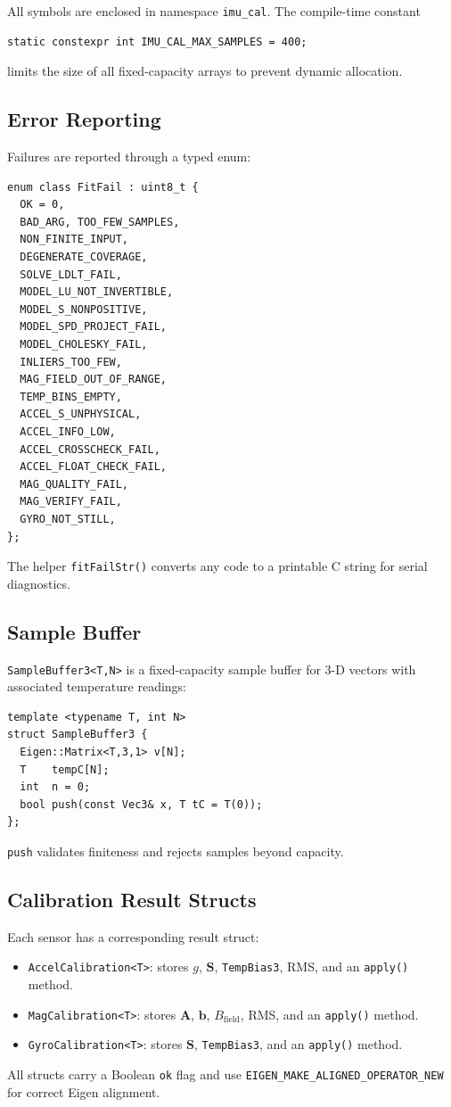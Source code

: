 \documentclass[conference]{IEEEtran}
\begin{document}
    All symbols are enclosed in namespace \texttt{imu\_cal}.
    The compile-time constant
    \begin{lstlisting}
static constexpr int IMU_CAL_MAX_SAMPLES = 400;
    \end{lstlisting}
    limits the size of all fixed-capacity arrays to prevent dynamic
    allocation.

    \subsection{Error Reporting}

    Failures are reported through a typed enum:
    \begin{lstlisting}
enum class FitFail : uint8_t {
  OK = 0,
  BAD_ARG, TOO_FEW_SAMPLES,
  NON_FINITE_INPUT,
  DEGENERATE_COVERAGE,
  SOLVE_LDLT_FAIL,
  MODEL_LU_NOT_INVERTIBLE,
  MODEL_S_NONPOSITIVE,
  MODEL_SPD_PROJECT_FAIL,
  MODEL_CHOLESKY_FAIL,
  INLIERS_TOO_FEW,
  MAG_FIELD_OUT_OF_RANGE,
  TEMP_BINS_EMPTY,
  ACCEL_S_UNPHYSICAL,
  ACCEL_INFO_LOW,
  ACCEL_CROSSCHECK_FAIL,
  ACCEL_FLOAT_CHECK_FAIL,
  MAG_QUALITY_FAIL,
  MAG_VERIFY_FAIL,
  GYRO_NOT_STILL,
};
    \end{lstlisting}
    The helper \texttt{fitFailStr()} converts any code to a printable
    C string for serial diagnostics.

    \subsection{Sample Buffer}

    \texttt{SampleBuffer3<T,N>} is a fixed-capacity sample buffer for
    3-D vectors with associated temperature readings:
    \begin{lstlisting}
template <typename T, int N>
struct SampleBuffer3 {
  Eigen::Matrix<T,3,1> v[N];
  T    tempC[N];
  int  n = 0;
  bool push(const Vec3& x, T tC = T(0));
};
    \end{lstlisting}
    \texttt{push} validates finiteness and rejects samples beyond capacity.

    \subsection{Calibration Result Structs}

    Each sensor has a corresponding result struct:
    \begin{itemize}
        \item \texttt{AccelCalibration<T>}: stores $g$, $\mathbf{S}$,
        \texttt{TempBias3}, RMS, and an \texttt{apply()} method.
        \item \texttt{MagCalibration<T>}: stores $\mathbf{A}$, $\mathbf{b}$,
        $B_\text{field}$, RMS, and an \texttt{apply()} method.
        \item \texttt{GyroCalibration<T>}: stores $\mathbf{S}$,
        \texttt{TempBias3}, and an \texttt{apply()} method.
    \end{itemize}
    All structs carry a Boolean \texttt{ok} flag and use
    \texttt{EIGEN\_MAKE\_ALIGNED\_OPERATOR\_NEW} for correct Eigen alignment.
\end{document}
